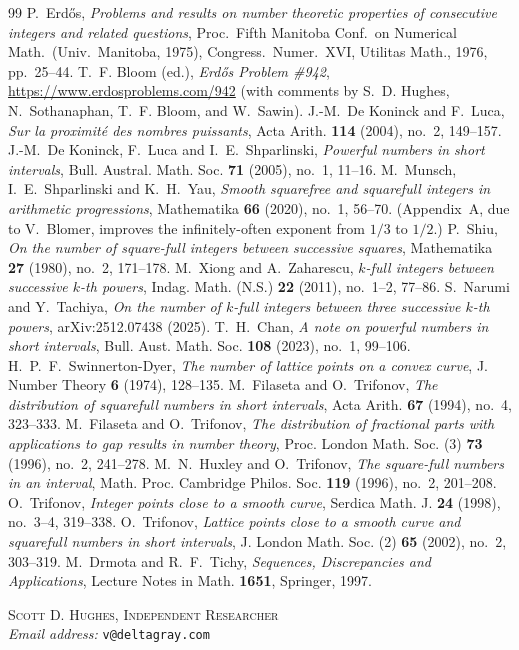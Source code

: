 \documentclass[11pt]{article}
\theoremstyle{definition}
\begin{document}
\begin{thebibliography}{99}
 P.~Erd\H{o}s, \emph{Problems and results on number theoretic properties of consecutive integers and related questions}, Proc.\ Fifth Manitoba Conf.\ on Numerical Math.\ (Univ.\ Manitoba, 1975), Congress.\ Numer.\ XVI, Utilitas Math., 1976, pp.~25--44.
 T.~F. Bloom (ed.), \emph{Erd\H{o}s Problem \#942}, \url{https://www.erdosproblems.com/942} (with comments by S.~D. Hughes, N.~Sothanaphan, T.~F. Bloom, and W.~Sawin).
 J.-M.~De Koninck and F.~Luca, \emph{Sur la proximit\'e des nombres puissants}, Acta Arith. \textbf{114} (2004), no.~2, 149--157.
 J.-M.~De Koninck, F.~Luca and I.~E.~Shparlinski, \emph{Powerful numbers in short intervals}, Bull. Austral. Math. Soc. \textbf{71} (2005), no.~1, 11--16.
 M.~Munsch, I.~E.~Shparlinski and K.~H.~Yau, \emph{Smooth squarefree and squarefull integers in arithmetic progressions}, Mathematika \textbf{66} (2020), no.~1, 56--70. (Appendix~A, due to V.~Blomer, improves the infinitely-often exponent from $1/3$ to $1/2$.)
 P.~Shiu, \emph{On the number of square-full integers between successive squares}, Mathematika \textbf{27} (1980), no.~2, 171--178.
 M.~Xiong and A.~Zaharescu, \emph{$k$-full integers between successive $k$-th powers}, Indag. Math. (N.S.) \textbf{22} (2011), no.~1--2, 77--86.
 S.~Narumi and Y.~Tachiya, \emph{On the number of $k$-full integers between three successive $k$-th powers}, arXiv:2512.07438 (2025).
 T.~H.~Chan, \emph{A note on powerful numbers in short intervals}, Bull. Aust. Math. Soc. \textbf{108} (2023), no.~1, 99--106.
 H.~P.~F.~Swinnerton-Dyer, \emph{The number of lattice points on a convex curve}, J. Number Theory \textbf{6} (1974), 128--135.
 M.~Filaseta and O.~Trifonov, \emph{The distribution of squarefull numbers in short intervals}, Acta Arith. \textbf{67} (1994), no.~4, 323--333.
 M.~Filaseta and O.~Trifonov, \emph{The distribution of fractional parts with applications to gap results in number theory}, Proc. London Math. Soc. (3) \textbf{73} (1996), no.~2, 241--278.
 M.~N.~Huxley and O.~Trifonov, \emph{The square-full numbers in an interval}, Math. Proc. Cambridge Philos. Soc. \textbf{119} (1996), no.~2, 201--208.
 O.~Trifonov, \emph{Integer points close to a smooth curve}, Serdica Math. J. \textbf{24} (1998), no.~3--4, 319--338.
 O.~Trifonov, \emph{Lattice points close to a smooth curve and squarefull numbers in short intervals}, J. London Math. Soc. (2) \textbf{65} (2002), no.~2, 303--319.
 M.~Drmota and R.~F.~Tichy, \emph{Sequences, Discrepancies and Applications}, Lecture Notes in Math. \textbf{1651}, Springer, 1997.
\end{thebibliography}

\bigskip
\noindent\textsc{Scott D. Hughes, Independent Researcher}\\
\noindent\textit{Email address:} \texttt{v@deltagray.com}
\end{document}
